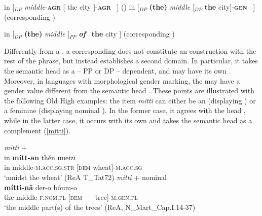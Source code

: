 \documentclass[output=paper,colorlinks,citecolor=brown]{langscibook}
\begin{document}
\begin{exe}
  \ex \label{cons}
     \begin{xlist}
        \ex  in  [$_{DP}$ \textit{middle}-\textbf{\textsc{agr}} [ the city ]-\textbf{\textsc{agr}} \ ] \hfill () 
        \ex  in [$_{DP}$ \textbf{(the)} \textit{middle}  [$_{DP}$ \textbf{the} city]-\textbf{\textsc{gen}} \ ] \hfill  (corresponding ) 

        \ex  in [$_{DP}$ \textbf{(the)} \textit{middle} [$_{PP}$ \textit{\textbf{of}} \ \textbf{the} city ] \hfill  (corresponding )
    \end{xlist}
\end{exe}


Differently from a , a corresponding  does not constitute  an  construction with the rest of the  phrase, but instead establishes a second  domain.  In particular, it takes the semantic head   as a --  PP or   DP -- dependent, and may have its own .    
Moreover, in languages with morphological gender marking, the  may have a gender value different from the semantic head . These  points are illustrated with the following Old High  examples: the item \textit{mitti} can either be an  (displaying ) or a feminine  (displaying nominal ). In the former case, it agrees with the head , while in the latter case, it occurs with its own  and takes the semantic head  as a  complement (\ref{mitti}).

\begin{exe}
  \ex \label{mitti}
     \begin{xlist}
      \ex  \textit{mitti} +  \\ 
      \gll in \textbf{mitt-an}  { thén}  uueizi   \\ 
          in  middle-\textsc{m.acc.sg.str}  [\textsc{dem}  wheat]-\textsc{m.acc.sg}  \\  
          \glt `amidst the wheat'    (ReA T\_Tat72)  
        \ex \textit{mitti} + nominal  \\ 
         \textbf{mítti-n\^{a}}  { der-o b\'oum-o}  \\ 
          the middle-\textsc{f.nom.pl}  [{\textsc{dem} \ \ \ tree}]-\textsc{m.gen.pl}   \\ 
          \glt `the middle part(s) of the trees'    (ReA, N\_Mart\_Cap.I.14-37)
     \end{xlist}
\end{exe}
\end{document}
